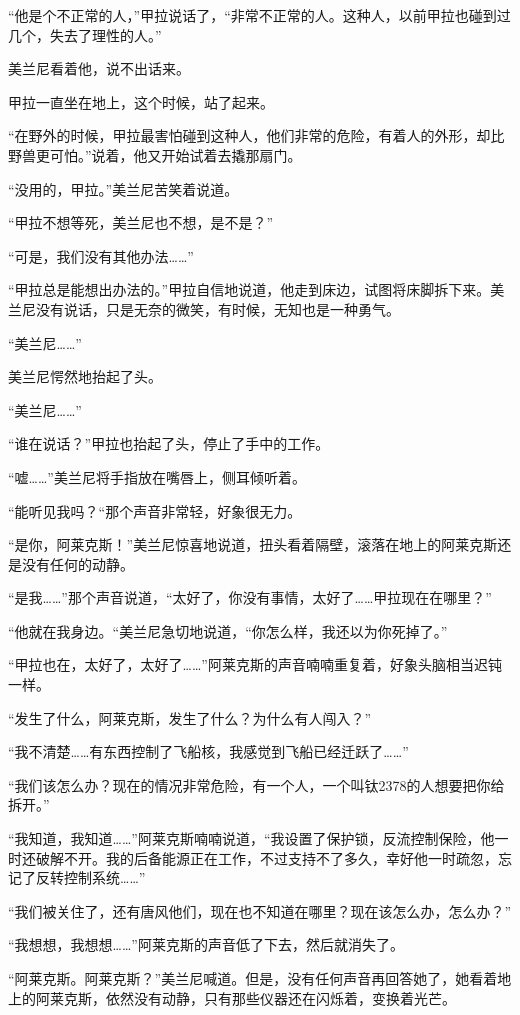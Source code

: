 “他是个不正常的人，”甲拉说话了，“非常不正常的人。这种人，以前甲拉也碰到过几个，失去了理性的人。” 

美兰尼看着他，说不出话来。 

甲拉一直坐在地上，这个时候，站了起来。 

“在野外的时候，甲拉最害怕碰到这种人，他们非常的危险，有着人的外形，却比野兽更可怕。”说着，他又开始试着去撬那扇门。 

“没用的，甲拉。”美兰尼苦笑着说道。 

“甲拉不想等死，美兰尼也不想，是不是？” 

“可是，我们没有其他办法……” 

“甲拉总是能想出办法的。”甲拉自信地说道，他走到床边，试图将床脚拆下来。美兰尼没有说话，只是无奈的微笑，有时候，无知也是一种勇气。 

“美兰尼……” 

美兰尼愕然地抬起了头。 

“美兰尼……” 

“谁在说话？”甲拉也抬起了头，停止了手中的工作。 

“嘘……”美兰尼将手指放在嘴唇上，侧耳倾听着。 

“能听见我吗？“那个声音非常轻，好象很无力。 

“是你，阿莱克斯！”美兰尼惊喜地说道，扭头看着隔壁，滚落在地上的阿莱克斯还是没有任何的动静。 

“是我……”那个声音说道，“太好了，你没有事情，太好了……甲拉现在在哪里？” 

“他就在我身边。“美兰尼急切地说道，“你怎么样，我还以为你死掉了。” 

“甲拉也在，太好了，太好了……”阿莱克斯的声音喃喃重复着，好象头脑相当迟钝一样。 

“发生了什么，阿莱克斯，发生了什么？为什么有人闯入？” 

“我不清楚……有东西控制了飞船核，我感觉到飞船已经迁跃了……” 

“我们该怎么办？现在的情况非常危险，有一个人，一个叫钛2378的人想要把你给拆开。” 

“我知道，我知道……”阿莱克斯喃喃说道，“我设置了保护锁，反流控制保险，他一时还破解不开。我的后备能源正在工作，不过支持不了多久，幸好他一时疏忽，忘记了反转控制系统……” 

“我们被关住了，还有唐风他们，现在也不知道在哪里？现在该怎么办，怎么办？” 

“我想想，我想想……”阿莱克斯的声音低了下去，然后就消失了。 

“阿莱克斯。阿莱克斯？”美兰尼喊道。但是，没有任何声音再回答她了，她看着地上的阿莱克斯，依然没有动静，只有那些仪器还在闪烁着，变换着光芒。 

